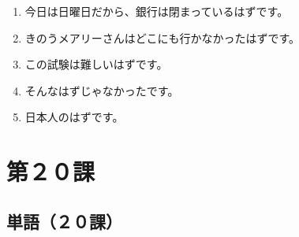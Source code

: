 \documentclass[notoc,notitlepage]{tufte-book}
\begin{document}
\begin{eg}
  \begin{enumerate}
    \item 今日は日曜日だから、銀行は閉まっているはずです。
    \item きのうメアリーさんはどこにも行かなかったはずです。
    \item この試験は難しいはずです。
    \item そんなはずじゃなかったです。
    \item 日本人のはずです。
  \end{enumerate}
\end{eg}



\chapter{第２０課}%
\label{chp:dai_20_ka}

\section{単語（２０課）}%
\label{sec:tango_c20}
\end{document}
